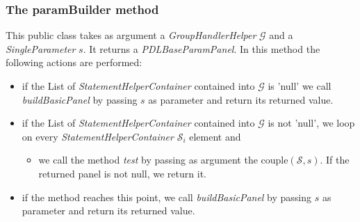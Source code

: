 \documentclass[a4paper,11pt] {ivoa}
\begin{document}
\subsubsection{The paramBuilder method}
This public class takes as argument a {\it GroupHandlerHelper} $\mathcal G$ and a {\it SingleParameter} $s$. It returns a {\it PDLBaseParamPanel}. In this method the following actions are performed:
\begin{itemize}
\item if the List of {\it StatementHelperContainer} contained into $\mathcal G$ is  'null' we call {\it buildBasicPanel} by passing $s$ as parameter and return its returned value.
\item if the List of {\it StatementHelperContainer} contained into $\mathcal G$ is  not 'null', we loop on every {\it StatementHelperContainer} $\mathcal S_i$ element and
\begin{itemize}
\item we call the method {\it test} by passing as argument the couple$(\mathcal S, s)$. If the returned panel is not null, we return it.
\end{itemize}
\item if the method reaches this point,  we call {\it buildBasicPanel} by passing $s$ as parameter and return its returned value.
\end{itemize}
\end{document}
